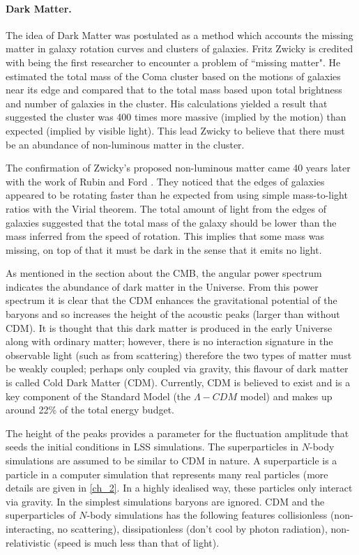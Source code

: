 \paragraph{Dark Matter.}
The idea of Dark Matter was postulated as a method which accounts the missing matter in galaxy rotation curves and clusters of galaxies. Fritz Zwicky \citep{bib_zwi} is credited with being the first researcher to encounter a problem of ``missing matter". He estimated the total mass of the Coma cluster based on the motions of galaxies near its edge and compared that to the total mass based upon total brightness and number of galaxies in the cluster. His calculations yielded a result that suggested the cluster was 400 times more massive (implied by the motion) than expected (implied by visible light). This lead Zwicky to believe that there must be an abundance of non-luminous matter in the cluster.

The confirmation of Zwicky's proposed non-luminous matter came 40 years later with the work of Rubin and Ford \citep{bib_rub}. They noticed that the edges of galaxies appeared to be rotating faster than he expected from using simple mass-to-light ratios with the Virial theorem. The total amount of light from the edges of galaxies suggested that the total mass of the galaxy should be lower than the mass inferred from the speed of rotation. This implies that some mass was missing, on top of that it must be dark in the sense that it emits no light.

As mentioned in the section about the CMB, the angular power spectrum indicates the abundance of dark matter in the Universe. From this power spectrum it is clear that the CDM enhances the gravitational potential of the baryons and so increases the height of the acoustic peaks (larger than without CDM). It is thought that this dark matter is produced in the early Universe along with ordinary matter; however, there is no interaction signature in the observable light (such as from scattering) therefore the two types of matter must be weakly coupled; perhaps only coupled via gravity, this flavour of dark matter is called Cold Dark Matter (CDM). Currently, CDM is believed to exist and is a key component of the Standard Model (the $\Lambda-CDM$ model) and makes up around 22\% of the total energy budget. \citep{bib_wmap}

The height of the peaks provides a parameter for the fluctuation amplitude that seeds the initial conditions in LSS simulations. The superparticles in $N$-body simulations are assumed to be similar to CDM in nature. A superparticle is a particle in a computer simulation that represents many real particles (more details are given in \ref{ch_2}. In a highly idealised way, these particles only interact via gravity. In the simplest simulations baryons are ignored. CDM and the superparticles of $N$-body simulations has the following features collisionless (non-interacting, no scattering), dissipationless (don't cool by photon radiation), non-relativistic (speed is much less than that of light).

